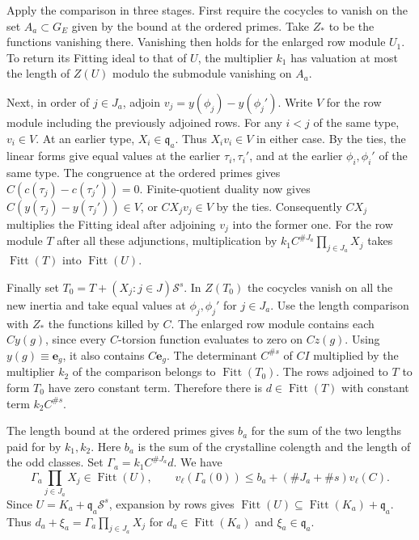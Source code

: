 Apply the comparison in three stages. First require the cocycles
to vanish on the set \(A_a\subset G_E\) given by the bound at the
ordered primes. Take \(Z_*\) to be the functions vanishing there.
Vanishing then holds for the enlarged row module \(U_1\).
To return its Fitting ideal to that of \(U\), the multiplier
\(k_1\) has valuation at most the length of \(Z(U)\) modulo the
submodule vanishing on \(A_a\).

Next, in order of \(j\in J_a\), adjoin \(v_j=y(\phi_j)-y(\phi_j')\).
Write \(V\) for the row module including the previously adjoined
rows. For any \(i<j\) of the same type, \(v_i\in V\). At an earlier
type, \(X_i\in\mathfrak q_a\). Thus \(X_i v_i\in V\) in either case.
By the ties, the linear forms give equal values at the earlier
\(\tau_i,\tau_i'\), and at the earlier \(\phi_i,\phi_i'\) of the
same type. The congruence at the ordered primes gives
\(C(c(\tau_j)-c(\tau_j'))=0\). Finite-quotient duality now gives
\(C(y(\tau_j)-y(\tau_j'))\in V\), or \(CX_jv_j\in V\) by the ties.
Consequently \(CX_j\) multiplies the Fitting ideal after adjoining
\(v_j\) into the former one. For the row module \(T\) after all
these adjunctions, multiplication by \(k_1 C^{\#J_a}\prod_{j\in J_a}X_j\)
takes \(\operatorname{Fitt}(T)\) into \(\operatorname{Fitt}(U)\).

Finally set \(T_0=T+(X_j:j\in J)\mathcal S^s\).
In \(Z(T_0)\) the cocycles vanish on all the new inertia and take
equal values at \(\phi_j,\phi_j'\) for \(j\in J_a\).
Use the length comparison with \(Z_*\) the functions killed by
\(C\). The enlarged row module contains each \(C y(g)\), since
every \(C\)-torsion function evaluates to zero on \(Cz(g)\).
Using \(y(g)\equiv\mathbf e_g\), it also contains \(C\mathbf e_g\).
The determinant \(C^{\#s}\) of \(CI\) multiplied by the multiplier
\(k_2\) of the comparison belongs to \(\operatorname{Fitt}(T_0)\).
The rows adjoined to \(T\) to form \(T_0\) have zero constant
term. Therefore there is \(d\in\operatorname{Fitt}(T)\) with
constant term \(k_2 C^{\#s}\).

The length bound at the ordered primes gives \(b_a\) for the sum
of the two lengths paid for by \(k_1,k_2\). Here \(b_a\) is the
sum of the crystalline colength and the length of the odd classes.
Set \(\Gamma_a=k_1 C^{\#J_a}d\). We have
\[
 \Gamma_a\prod_{j\in J_a}X_j\in\operatorname{Fitt}(U),\qquad
 v_\ell(\Gamma_a(0))\le b_a+(\#J_a+\#s)v_\ell(C).
\]
Since \(U=K_a+\mathfrak q_a\mathcal S^s\), expansion by rows gives
\(\operatorname{Fitt}(U)\subseteq\operatorname{Fitt}(K_a)+\mathfrak q_a\).
Thus \(d_a+\xi_a=\Gamma_a\prod_{j\in J_a}X_j\) for
\(d_a\in\operatorname{Fitt}(K_a)\) and \(\xi_a\in\mathfrak q_a\).

